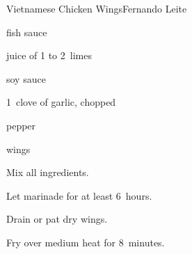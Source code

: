 \begin{recipe}{Vietnamese Chicken Wings}{Fernando Leite}{}

\begin{ingredients}
\item {} fish sauce
\item juice of 1 to 2~limes
\item {} soy sauce
\item 1~clove of garlic, chopped 
\item pepper
\item {} wings
\end{ingredients}

\begin{directions}
\item Mix all ingredients.
\item Let marinade for at least 6~hours.
\item Drain or pat dry wings.
\item Fry over medium heat for 8~minutes.
\end{directions}

\end{recipe}
